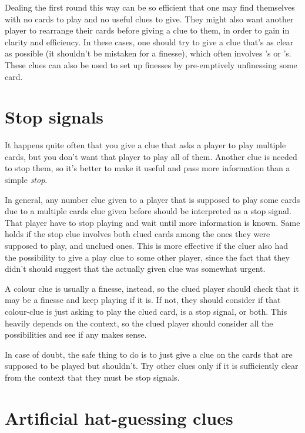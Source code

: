 \documentclass[a4paper]{article}
\theoremstyle{plain}
\theoremstyle{definition}
\begin{document}
Dealing the first round this way can be so efficient that one may find themselves with no cards to play and no useful clues to give. They might also want another player to rearrange their cards before giving a clue to them, in order to gain in clarity and efficiency. In these cases, one should try to give a clue that's as clear as possible (it shouldn't be mistaken for a finesse), which often involves 's or 's. These clues can also be used to set up finesses by pre-emptively unfinessing some card. 
                                                           
\section{Stop signals}
\label{stopsignals}

It happens quite often that you give a clue that asks a player to play multiple cards, but you don't want that player to play all of them. Another clue is needed to stop them, so it's better to make it useful and pass more information than a simple \textit{stop}.

In general, any number clue given to a player that is supposed to play some cards due to a multiple cards clue given before should be interpreted as a stop signal. That player have to stop playing and wait until more information is known. Same holds if the stop clue involves both clued cards among the ones they were supposed to play, and unclued ones. This is more effective if the cluer also had the possibility to give a play clue to some other player, since the fact that they didn't should suggest that the actually given clue was somewhat urgent.

A colour clue is usually a finesse, instead, so the clued player should check that it may be a finesse and keep playing if it is. If not, they should consider if that colour-clue is just asking to play the clued card, is a stop signal, or both. This heavily depends on the context, so the clued player should consider all the possibilities and see if any makes sense.

In case of doubt, the safe thing to do is to just give a clue on the cards that are supposed to be played but shouldn't. Try other clues only if it is sufficiently clear from the context that they must be stop signals.

\section{Artificial hat-guessing clues}
\label{sec:mod8}
\end{document}
